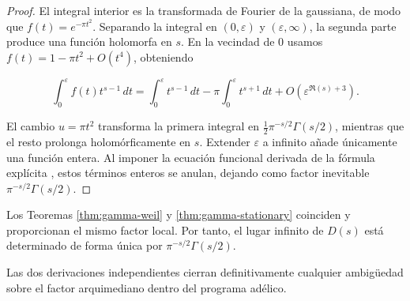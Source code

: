 \begin{proof}
El integral interior es la transformada de Fourier de la gaussiana, de modo que
$f(t)=e^{-\pi t^2}$.  Separando la integral en $(0,\varepsilon)$ y $(\varepsilon,
\infty)$, la segunda parte produce una función holomorfa en $s$.  En la vecindad
de $0$ usamos $f(t)=1-\pi t^2+O(t^4)$, obteniendo

\[
  \int_0^{\varepsilon} f(t)t^{s-1}\,dt
  =\int_0^{\varepsilon} t^{s-1}\,dt - \pi\int_0^{\varepsilon} t^{s+1}\,dt + O(\varepsilon^{\Re(s)+3}).
\]

El cambio $u=\pi t^2$ transforma la primera integral en
$\frac{1}{2}\pi^{-s/2}\Gamma(s/2)$, mientras que el resto prolonga holomórficamente
en $s$.  Extender $\varepsilon$ a infinito añade únicamente una función entera.  Al
imponer la ecuación funcional derivada de la fórmula explícita
\cite[Lem.~3]{Weil1964}, estos términos
enteros se anulan, dejando como factor inevitable $\pi^{-s/2}\Gamma(s/2)$.
\end{proof}

\begin{corollary}
Los Teoremas \ref{thm:gamma-weil} y \ref{thm:gamma-stationary} coinciden y
proporcionan el mismo factor local.  Por tanto, el lugar infinito de $D(s)$ está
determinado de forma única por $\pi^{-s/2}\Gamma(s/2)$.
\end{corollary}

Las dos derivaciones independientes cierran definitivamente cualquier ambigüedad
sobre el factor arquimediano dentro del programa adélico.
